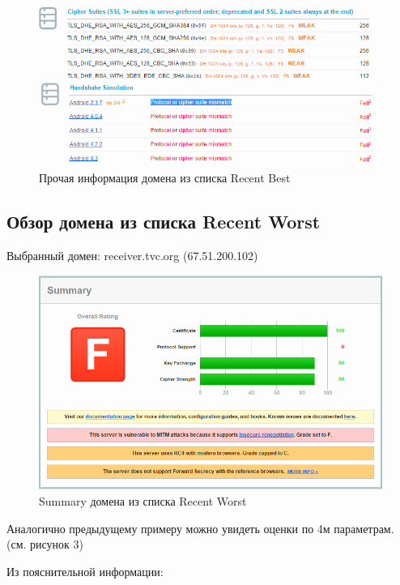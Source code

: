 \documentclass[11pt, a4paper]{article}		%
\begin{document}
\begin{figure}[h!]
\centering
\includegraphics[scale=0.8]{res/2}
\caption{Прочая информация домена из списка Recent Best}
\end{figure}




\subsection{Обзор домена из списка Recent Worst}

Выбранный домен: receiver.tvc.org (67.51.200.102)

\begin{figure}[h!]
\centering
\includegraphics[scale=0.8]{res/3}
\caption{Summary домена из списка Recent Worst}
\end{figure}

Аналогично предыдущему примеру можно увидеть оценки по 4м параметрам. (см. рисунок 3)

Из пояснительной информации:
\end{document}
